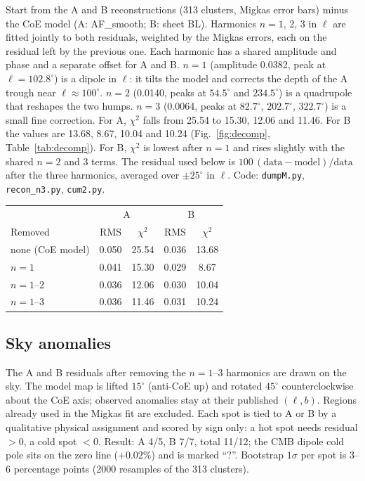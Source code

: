 \documentclass[10pt,twocolumn]{article}
\begin{document}
Start from the A and B reconstructions (313 clusters, Migkas error bars) minus the CoE model (A: AF\_smooth; B: sheet BL). Harmonics $n=1$, 2, 3 in $\ell$ are fitted jointly to both residuals, weighted by the Migkas errors, each on the residual left by the previous one. Each harmonic has a shared amplitude and phase and a separate offset for A and B. $n=1$ (amplitude 0.0382, peak at $\ell=102.8^\circ$) is a dipole in $\ell$: it tilts the model and corrects the depth of the A trough near $\ell\approx100^\circ$. $n=2$ (0.0140, peaks at $54.5^\circ$ and $234.5^\circ$) is a quadrupole that reshapes the two humps. $n=3$ (0.0064, peaks at $82.7^\circ$, $202.7^\circ$, $322.7^\circ$) is a small fine correction. For A, $\chi^2$ falls from 25.54 to 15.30, 12.06 and 11.46. For B the values are 13.68, 8.67, 10.04 and 10.24 (Fig.~\ref{fig:decomp}, Table~\ref{tab:decomp}). For B, $\chi^2$ is lowest after $n=1$ and rises slightly with the shared $n=2$ and 3 terms. The residual used below is $100\,(\mathrm{data}-\mathrm{model})/\mathrm{data}$ after the three harmonics, averaged over $\pm25^\circ$ in $\ell$. Code: \texttt{dumpM.py}, \texttt{recon\_n3.py}, \texttt{cum2.py}.
\par\medskip\noindent\begin{minipage}{\columnwidth}\centering\small{}\label{tab:decomp}
\begin{tabular}{@{}lcccc@{}}\toprule
 & \multicolumn{2}{c}{A} & \multicolumn{2}{c}{B}\\ Removed & RMS & $\chi^2$ & RMS & $\chi^2$\\\midrule
none (CoE model) & 0.050 & 25.54 & 0.036 & 13.68\\
$n=1$ & 0.041 & 15.30 & 0.029 & 8.67\\
$n=1$--2 & 0.036 & 12.06 & 0.030 & 10.04\\
$n=1$--3 & 0.036 & 11.46 & 0.031 & 10.24\\\bottomrule\end{tabular}\end{minipage}\par\medskip


\subsection{Sky anomalies}
The A and B residuals after removing the $n=1$--3 harmonics are drawn on the sky. The model map is lifted $15^\circ$ (anti-CoE up) and rotated $45^\circ$ counterclockwise about the CoE axis; observed anomalies stay at their published $(\ell,b)$. Regions already used in the Migkas fit are excluded. Each spot is tied to A or B by a qualitative physical assignment and scored by sign only: a hot spot needs residual $>0$, a cold spot $<0$. Result: A 4/5, B 7/7, total 11/12; the CMB dipole cold pole sits on the zero line ($+0.02\%$) and is marked ``?''. Bootstrap $1\sigma$ per spot is 3--6 percentage points (2000 resamples of the 313 clusters).
\end{document}

